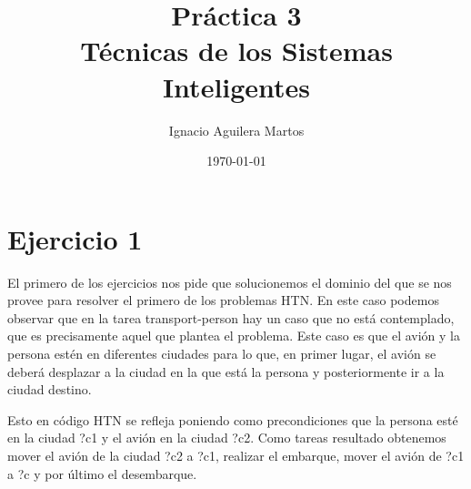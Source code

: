 \documentclass[12pt,a4paper]{article}
\author{Ignacio Aguilera Martos}
\title{Práctica 3 \\ Técnicas de los Sistemas Inteligentes}
\date{\today}
\begin{document}
	\maketitle

	\tableofcontents

	\newpage

\section{Ejercicio 1}

El primero de los ejercicios nos pide que solucionemos el dominio del que se nos provee para resolver el primero de los problemas HTN. En este caso podemos observar que en la tarea transport-person hay un caso que no está contemplado, que es precisamente aquel que plantea el problema. Este caso es que el avión y la persona estén en diferentes ciudades para lo que, en primer lugar, el avión se deberá desplazar a la ciudad en la que está la persona y posteriormente ir a la ciudad destino.

Esto en código HTN se refleja poniendo como precondiciones que la persona esté en la ciudad ?c1 y el avión en la ciudad ?c2. Como tareas resultado obtenemos mover el avión de la ciudad ?c2 a ?c1, realizar el embarque, mover el avión de ?c1 a ?c y por último el desembarque.
\end{document}
